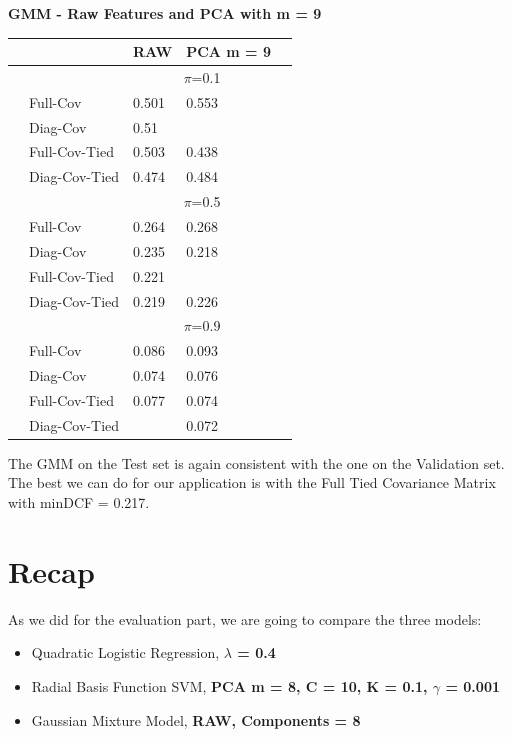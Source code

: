 \documentclass[english]{report}
\begin{document}
\textbf{GMM - Raw Features and PCA with m = 9}
\begin{table}[H]
    \centering
    \begin{tabular}{ll|l|ll}
        \hline
                                & & RAW & PCA m = 9 \\ \hline
                                & & \multicolumn{2}{c}{$\pi$=0.1} \\ \hline
                                & Full-Cov        & 0.501  & 0.553 \\
                                & Diag-Cov        & 0.51 & \color{red}{0.467} \\
                                & Full-Cov-Tied   & 0.503 & 0.438 \\ 
                                & Diag-Cov-Tied   & 0.474 & 0.484 \\ \hline

                                & & \multicolumn{2}{c}{$\pi$=0.5} \\ \hline
                                & Full-Cov          & 0.264  & 0.268   \\
                                & Diag-Cov          & 0.235  & 0.218 \\
                                & Full-Cov-Tied     & 0.221  & \color{red}{0.217} \\ 
                                & Diag-Cov-Tied     & 0.219  & 0.226 \\ \hline

                                & & \multicolumn{2}{c}{$\pi$=0.9} \\ \hline
                                & Full-Cov          & 0.086  & 0.093  \\
                                & Diag-Cov          & 0.074  & 0.076\\
                                & Full-Cov-Tied     & 0.077  & 0.074\\ 
                                & Diag-Cov-Tied     & \color{red}{0.071}  & 0.072\\  
    \hline
    \end{tabular}
    \label{tab:GMM_RAW_eval}
\end{table}
The GMM on the Test set is again consistent with the one on the Validation set.
The best we can do for our application is with the Full Tied Covariance Matrix with minDCF = 0.217.

\newpage
\section{Recap}
As we did for the evaluation part, we are going to compare the three models:
\begin{itemize}
    \item Quadratic Logistic Regression, \textbf{$\lambda$ = 0.4}
    \item Radial Basis Function SVM, \textbf{PCA m = 8, C = 10, K = 0.1, $\gamma$ = 0.001}
    \item Gaussian Mixture Model, \textbf{RAW, Components = 8}
\end{itemize}
\end{document}
